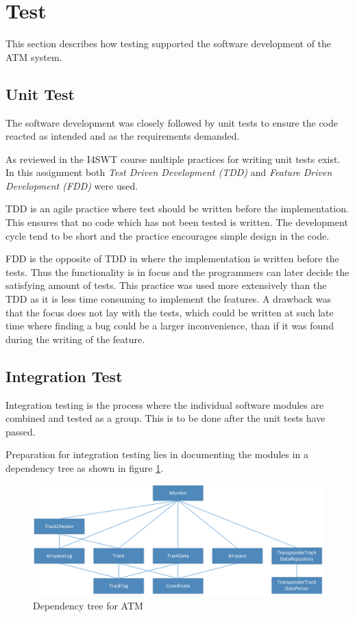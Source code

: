 	\section{Test}
	This section describes how testing supported the software development of the ATM system.
	
	\subsection{Unit Test}
	The software development was closely followed by unit tests to ensure the code reacted as intended and as the requirements demanded.
	
	As reviewed in the I4SWT course multiple practices for writing unit tests exist. In this assignment both \emph{Test Driven Development (TDD)} and \emph{Feature Driven Development (FDD)} were used.
	
	TDD is an agile practice where test should be written before the implementation. This ensures that no code which has not been tested is written. The development cycle tend to be short and the practice encourages simple design in the code.
	
	FDD is the opposite of TDD in where the implementation is written before the tests. Thus the functionality is in focus and the programmers can later decide the satisfying amount of tests. This practice was used more extensively than the TDD as it is less time consuming to implement the features. A drawback was that the focus does not lay with the tests, which could be written at such late time where finding a bug could be a larger inconvenience, than if it was found during the writing of the feature.
	
	\subsection{Integration Test}
	Integration testing is the process where the individual software modules are combined and tested as a group. This is to be done after the unit tests have passed. 
	
	Preparation for integration testing lies in documenting the modules in a dependency tree as shown in figure \ref{fig:Dependencytree}. 
	
	
	\begin{figure}
		\centering
		\includegraphics[width=1.0\linewidth]{"Images/Dependencytree"}
		\caption{Dependency tree for ATM}
		\label{fig:Dependencytree}
	\end{figure}
	
